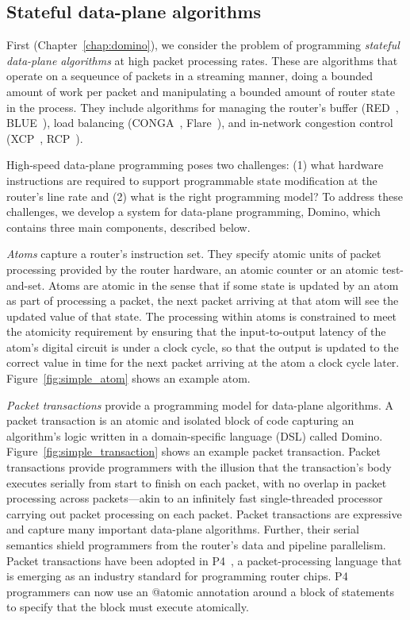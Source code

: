 \subsection{Stateful data-plane algorithms}
First (Chapter~\ref{chap:domino}), we consider the problem of programming {\em
stateful data-plane algorithms} at high packet processing rates. These are
algorithms that operate on a sequeunce of packets in a streaming manner, doing
a bounded amount of work per packet and manipulating a bounded amount of router
state in the process.  They include algorithms for managing the router's buffer
(\eg RED~\cite{red}, BLUE~\cite{blue}), load balancing (\eg CONGA~\cite{conga},
Flare~\cite{flare}), and in-network congestion control (\eg XCP~\cite{xcp},
RCP~\cite{rcp}).

High-speed data-plane programming poses two challenges: (1) what hardware
instructions are required to support programmable state modification at the
router's line rate and (2) what is the right programming model? To address
these challenges, we develop a system for data-plane programming, Domino, which
contains three main components, described below.

 \textit{Atoms} capture a router's instruction set. They specify atomic
units of packet processing provided by the router hardware, \eg an atomic
counter or an atomic test-and-set. Atoms are atomic in the sense that if some
state is updated by an atom as part of processing a packet, the next packet
arriving at that atom will see the updated value of that state. The processing
within atoms is constrained to meet the atomicity requirement by ensuring that
the input-to-output latency of the atom's digital circuit is under a clock
cycle, so that the output is updated to the correct value in time for the next
packet arriving at the atom a clock cycle later. Figure~\ref{fig:simple_atom}
shows an example atom.

 \textit{Packet transactions} provide a programming model for data-plane
algorithms. A packet transaction is an atomic and isolated block of code
capturing an algorithm's logic written in a domain-specific language (DSL)
called Domino. Figure~\ref{fig:simple_transaction} shows an example packet transaction.
Packet transactions provide programmers with the illusion that the transaction's body
executes serially from start to finish on each packet, with
no overlap in packet processing across packets---akin to an infinitely fast single-threaded
processor carrying out packet processing on each packet. Packet
transactions are expressive and capture many important data-plane algorithms.
Further, their serial semantics shield programmers from the router's data and pipeline
parallelism. Packet transactions have been adopted in P4~\cite{p4}, a
packet-processing language that is emerging as an industry standard for
programming router chips.  P4 programmers can now use an @atomic annotation
around a block of statements to specify that the block must execute atomically.

